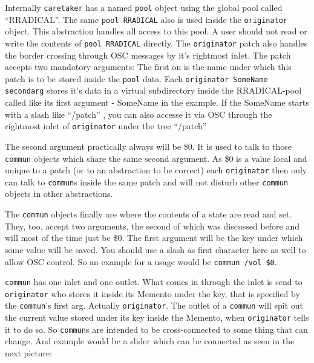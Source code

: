 \documentclass[10pt,english]{scrartcl}
\begin{document}
Internally \texttt{caretaker} has a named \texttt{pool} object using the global pool
called ``RRADICAL''. The same \texttt{pool RRADICAL} also is used inside the
\texttt{originator} object. This abstraction handles all access to this pool. A
user should not read or write the contents of \texttt{pool RRADICAL} directly.
The \texttt{originator} patch also handles the border crossing through OSC
messages by it's rightmost inlet. The patch accepts two mandatory
arguments: The first on is the name under which this patch is to be stored
inside the \texttt{pool} data. Each \texttt{originator SomeName secondarg}  stores
it's data in a virtual subdirectory inside the RRADICAL-pool called like
its first argument - SomeName in the example. If the SomeName starts with a
slash like ``/patch'' , you can also accesse it via OSC through the rightmost inlet of
\texttt{originator} under the tree ``/patch''

The second argument practically always will be {\$}0. It is used to talk to
those \texttt{commun} objects which share the same second argument. As {\$}0 is a
value local and unique to a patch (or to an abstraction to be correct) each
\texttt{originator} then only can talk to \texttt{commun}s inside the same patch and
will not disturb other \texttt{commun} objects in other abstractions.

The \texttt{commun} objects finally are where the contents of a state are read
and set. They, too, accept two arguments, the second of which was
discussed before and will most of the time just be {\$}0. The first argument
will be the key under which some value will be saved. You should use a slash
as first character here as well to allow OSC control. So an example for a
usage would be \texttt{commun /vol {\$}0}.

\texttt{commun} has one inlet and one outlet. What comes in through the inlet is
send to \texttt{originator} who stores it inside its Memento under the key, that
is specified by the \texttt{commun}'s first arg. Actually \texttt{originator}. The
outlet of a \texttt{commun} will spit out the current value stored under its key
inside the Memento, when \texttt{originator} tells it to do so. So \texttt{commun}s
are intended to be cross-connected to some thing that can change. And
example would be a slider which can be connected as seen in the next
picture:
\end{document}
